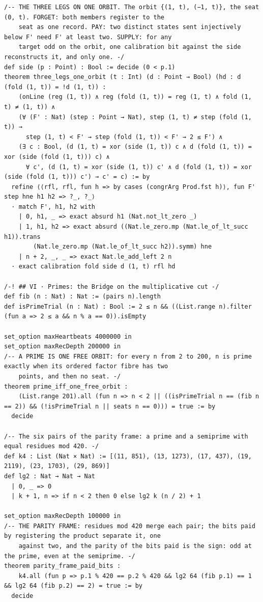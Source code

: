\documentclass[10pt,twocolumn]{article}
\begin{document}
\begin{Verbatim}
/-- THE THREE LEGS ON ONE ORBIT. The orbit {(1, t), (−1, t)}, the seat (0, t). FORGET: both members register to the
    seat as one record. PAY: two distinct states sent injectively below F' need F' at least two. SUPPLY: for any
    target odd on the orbit, one calibration bit against the side reconstructs it, and only one. -/
def side (p : Point) : Bool := decide (0 < p.1)
theorem three_legs_one_orbit (t : Int) (d : Point → Bool) (hd : d (fold (1, t)) = !d (1, t)) :
    (onLine (reg (1, t)) ∧ reg (fold (1, t)) = reg (1, t) ∧ fold (1, t) ≠ (1, t)) ∧
    (∀ (F' : Nat) (step : Point → Nat), step (1, t) ≠ step (fold (1, t)) →
      step (1, t) < F' → step (fold (1, t)) < F' → 2 ≤ F') ∧
    (∃ c : Bool, (d (1, t) = xor (side (1, t)) c ∧ d (fold (1, t)) = xor (side (fold (1, t))) c) ∧
      ∀ c', (d (1, t) = xor (side (1, t)) c' ∧ d (fold (1, t)) = xor (side (fold (1, t))) c') → c' = c) := by
  refine ⟨⟨rfl, rfl, fun h => by cases (congrArg Prod.fst h)⟩, fun F' step hne h1 h2 => ?_, ?_⟩
  · match F', h1, h2 with
    | 0, h1, _ => exact absurd h1 (Nat.not_lt_zero _)
    | 1, h1, h2 => exact absurd ((Nat.le_zero.mp (Nat.le_of_lt_succ h1)).trans
        (Nat.le_zero.mp (Nat.le_of_lt_succ h2)).symm) hne
    | n + 2, _, _ => exact Nat.le_add_left 2 n
  · exact calibration fold side d (1, t) rfl hd

/-! ## VI · Primes: the Bridge on the multiplicative cut -/
def fib (n : Nat) : Nat := (pairs n).length
def isPrimeTrial (n : Nat) : Bool := 2 ≤ n && ((List.range n).filter (fun a => 2 ≤ a && n % a == 0)).isEmpty

set_option maxHeartbeats 4000000 in
set_option maxRecDepth 200000 in
/-- A PRIME IS ONE FREE ORBIT: for every n from 2 to 200, n is prime exactly when its ordered factor fibre has two
    points, and then no seat. -/
theorem prime_iff_one_free_orbit :
    (List.range 201).all (fun n => n < 2 || ((isPrimeTrial n == (fib n == 2)) && (!isPrimeTrial n || seats n == 0))) = true := by
  decide

/-- The six pairs of the parity frame: a prime and a semiprime with equal residues mod 420. -/
def k4 : List (Nat × Nat) := [(11, 851), (13, 1273), (17, 437), (19, 2119), (23, 1703), (29, 869)]
def lg2 : Nat → Nat → Nat
  | 0, _ => 0
  | k + 1, n => if n < 2 then 0 else lg2 k (n / 2) + 1

set_option maxRecDepth 100000 in
/-- THE PARITY FRAME: residues mod 420 merge each pair; the bits paid by registering the product separate it, one
    against two, and the parity of the bits paid is the sign: odd at the prime, even at the semiprime. -/
theorem parity_frame_paid_bits :
    k4.all (fun p => p.1 % 420 == p.2 % 420 && lg2 64 (fib p.1) == 1 && lg2 64 (fib p.2) == 2) = true := by
  decide


\end{Verbatim}
\end{document}
